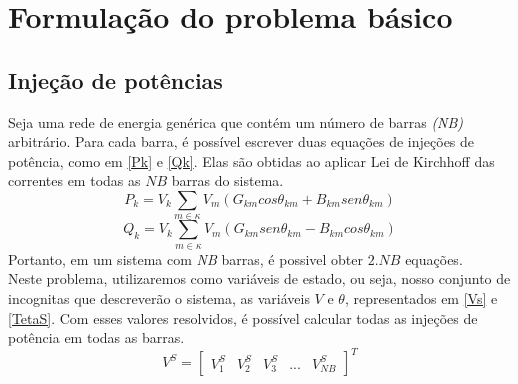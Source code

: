 \section{Formula\c{c}\~ao do problema b\'asico}
\label{SectionFormula}
\subsection{Injeção de potências}

Seja uma rede de energia gen\'erica que cont\'em um n\'umero de barras \textit{(NB)} arbitr\'ario. Para cada barra, \'e poss\'ivel escrever duas equa\c{c}\~oes de inje\c{c}\~oes de pot\^encia, como em \ref{Pk} e \ref{Qk}. Elas são obtidas ao aplicar Lei de Kirchhoff das correntes em todas as $NB$ barras do sistema.\\
\begin{equation}
    P_k = V_k \sum_{m\in \kappa} V_m (G_{km} cos\theta_{km} + B_{km}sen\theta_{km})
    \label{Pk}
\end{equation}
\begin{equation}
    Q_k = V_k \sum_{m\in \kappa} V_m (G_{km} sen\theta_{km} - B_{km}cos\theta_{km})
    \label{Qk}
\end{equation}
Portanto, em um sistema com \textit{NB} barras, \'e possivel obter $2.NB$ equa\c{c}\~oes.\\
Neste problema, utilizaremos como variáveis de estado, ou seja, nosso conjunto de incognitas que descreverão o sistema, as variáveis $V$ e $\theta$, representados em \ref{Vs} e \ref{TetaS}. Com esses valores resolvidos, \'e possível calcular todas as injeções de potência em todas as barras.\\
\begin{equation}
    V^S  = \left[ \begin{matrix} V_1^S & V_2^S & V_3^S & ... & V_{NB}^S  \end{matrix} \right]^T 
    \label{Vs}
\end{equation}

